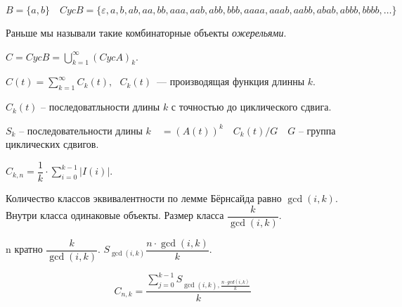 $B = \{a, b\}\quad Cyc B = \{\varepsilon, a, b, ab, aa, bb, aaa, aab, abb, bbb, aaaa, aaab, aabb, abab, abbb, bbbb, \ldots\}$

Раньше мы называли такие комбинаторные объекты \textit{ожерельями}.

$C = Cyc B = \bigcup_{k = 1}^\infty \left( Cyc A\right)_k$.

$C(t) = \sum_{k=1}^\infty C_k (t),~~~ C_k (t)$~--- производящая функция длинны $k$.

$C_k(t)$ -- последоватльности длины $k$ с точностью до циклического сдвига.

$S_k$ -- последовательности длины $k\quad = (A(t))^k \quad C_k(t) / G\quad G$ -- группа циклических сдвигов.

$C_{k, n} = \dfrac{1}{k} \cdot \sum_{i=0}^{k - 1} \left| I(i) \right|$.

Количество классов эквивалентности по лемме Бёрнсайда равно $\gcd(i, k)$. Внутри класса одинаковые объекты.
Размер класса $\dfrac{k}{\gcd(i, k)}$.

n кратно $\dfrac{k}{\gcd(i, k)}$. $S_{\gcd(i, k)} \dfrac{n \cdot \gcd(i, k)}{k}$.

\[ C_{n, k} =  \dfrac{\sum_{j =0  }^ {k - 1} S_{\gcd(i, k), \frac{n \cdot gcd(i,k)}{k}}}{k}
\]
